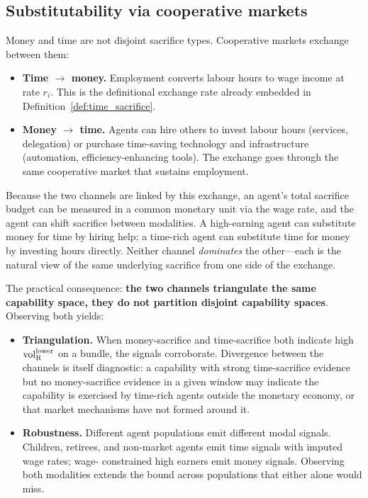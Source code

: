\subsection{Substitutability via cooperative markets}
\label{sec:channel_substitutability}

Money and time are not disjoint sacrifice types.  Cooperative
markets exchange between them:
\begin{itemize}
\item \textbf{Time $\to$ money.}  Employment converts labour hours
  to wage income at rate $r_i$.  This is the definitional
  exchange rate already embedded in
  Definition~\ref{def:time_sacrifice}.
\item \textbf{Money $\to$ time.}  Agents can hire others to
  invest labour hours (services, delegation) or purchase
  time-saving technology and infrastructure (automation,
  efficiency-enhancing tools).  The exchange goes through the
  same cooperative market that sustains employment.
\end{itemize}

Because the two channels are linked by this exchange, an agent's
total sacrifice budget can be measured in a common monetary unit
via the wage rate, and the agent can shift sacrifice between
modalities.  A high-earning agent can substitute money for time
by hiring help; a time-rich agent can substitute time for money
by investing hours directly.  Neither channel \emph{dominates}
the other---each is the natural view of the same underlying
sacrifice from one side of the exchange.

The practical consequence: \textbf{the two channels triangulate
the same capability space, they do not partition disjoint
capability spaces}.  Observing both yields:

\begin{itemize}
\item \textbf{Triangulation.}  When money-sacrifice and
  time-sacrifice both indicate high ${\operatorname{vol}_{\mathrm{R}}^{\mathrm{lower}}}$ on a bundle,
  the signals corroborate.  Divergence between the channels is
  itself diagnostic: a capability with strong time-sacrifice
  evidence but no money-sacrifice evidence in a given window
  may indicate the capability is exercised by time-rich agents
  outside the monetary economy, or that market mechanisms have
  not formed around it.
\item \textbf{Robustness.}  Different agent populations emit
  different modal signals.  Children, retirees, and non-market
  agents emit time signals with imputed wage rates; wage-
  constrained high earners emit money signals.  Observing both
  modalities extends the bound across populations that either
  alone would miss.
\end{itemize}

